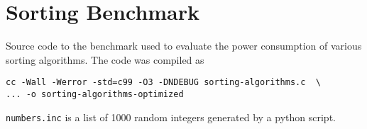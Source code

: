 \chapter{Sorting Benchmark}

\label{AppendixB}


Source code to the benchmark used to evaluate the power consumption of
various sorting algorithms.  The code was compiled as

\begin{verbatim}
cc -Wall -Werror -std=c99 -O3 -DNDEBUG sorting-algorithms.c  \
... -o sorting-algorithms-optimized
\end{verbatim}

\texttt{numbers.inc} is a list of 1000 random integers generated by a
python script.

